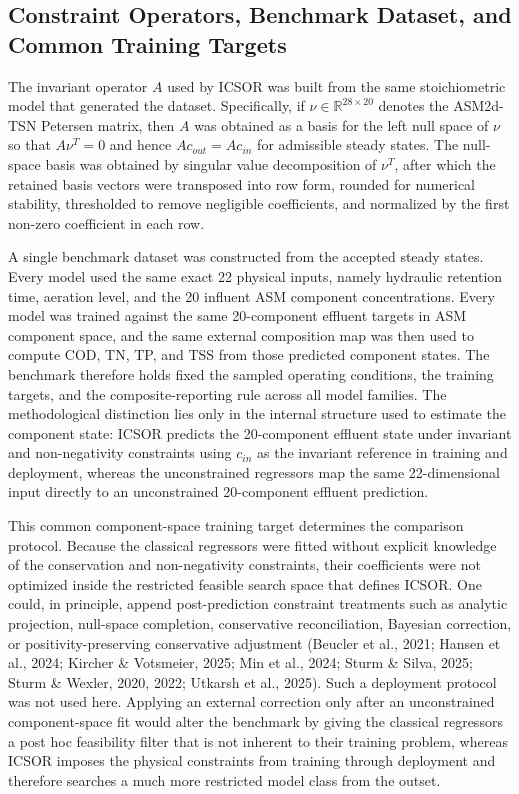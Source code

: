 \documentclass[a4paper,fleqn]{cas-sc}
\newenvironment{revblock}{\begingroup\color{revDefault}}{\endgroup}
\newenvironment{revblockr22}{\begingroup\color{revRtwoTwo}}{\endgroup}
\begin{document}
\begin{revblock}
\begin{revblockr22}
\subsection{Constraint Operators, Benchmark Dataset, and Common Training Targets}

The invariant operator $A$ used by ICSOR was built from the same stoichiometric model that generated the dataset. Specifically, if $\nu \in \mathbb{R}^{28 \times 20}$ denotes the ASM2d-TSN Petersen matrix, then $A$ was obtained as a basis for the left null space of $\nu$ so that $A\nu^T=0$ and hence $Ac_{out}=Ac_{in}$ for admissible steady states. The null-space basis was obtained by singular value decomposition of $\nu^T$, after which the retained basis vectors were transposed into row form, rounded for numerical stability, thresholded to remove negligible coefficients, and normalized by the first non-zero coefficient in each row.

A single benchmark dataset was constructed from the accepted steady states. Every model used the same exact 22 physical inputs, namely hydraulic retention time, aeration level, and the 20 influent ASM component concentrations. Every model was trained against the same 20-component effluent targets in ASM component space, and the same external composition map was then used to compute COD, TN, TP, and TSS from those predicted component states. The benchmark therefore holds fixed the sampled operating conditions, the training targets, and the composite-reporting rule across all model families. The methodological distinction lies only in the internal structure used to estimate the component state: ICSOR predicts the 20-component effluent state under invariant and non-negativity constraints using $c_{in}$ as the invariant reference in training and deployment, whereas the unconstrained regressors map the same 22-dimensional input directly to an unconstrained 20-component effluent prediction.

This common component-space training target determines the comparison protocol. Because the classical regressors were fitted without explicit knowledge of the conservation and non-negativity constraints, their coefficients were not optimized inside the restricted feasible search space that defines ICSOR. One could, in principle, append post-prediction constraint treatments such as analytic projection, null-space completion, conservative reconciliation, Bayesian correction, or positivity-preserving conservative adjustment (Beucler et al., 2021; Hansen et al., 2024; Kircher \& Votsmeier, 2025; Min et al., 2024; Sturm \& Silva, 2025; Sturm \& Wexler, 2020, 2022; Utkarsh et al., 2025). Such a deployment protocol was not used here. Applying an external correction only after an unconstrained component-space fit would alter the benchmark by giving the classical regressors a post hoc feasibility filter that is not inherent to their training problem, whereas ICSOR imposes the physical constraints from training through deployment and therefore searches a much more restricted model class from the outset.
\end{revblockr22}


\end{revblock}
\end{document}
